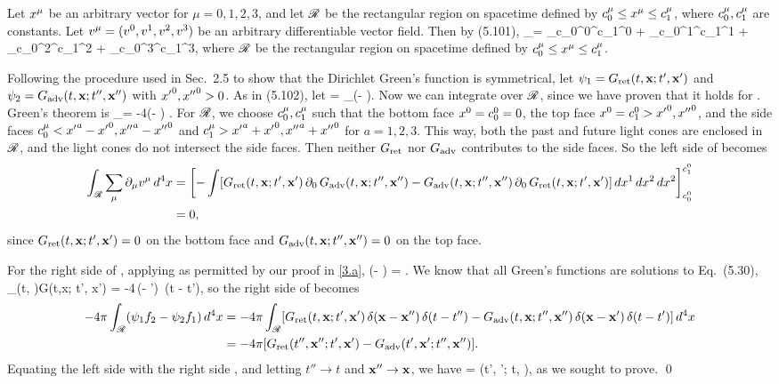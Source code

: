 \begin{solution}
	Let $x^\mu$ be an arbitrary vector for $\mu = 0, 1, 2, 3$, and let $\mathscr{R}$ be the rectangular region on spacetime defined by $c^\mu_0 \leq x^\mu \leq c^\mu_1$, where $c^\mu_0, c^\mu_1$ are constants.  Let $v^\mu = (v^0, v^1, v^2, v^3)$ be an arbitrary differentiable vector field.  Then by (5.101),
	\beq
		\intsR \sum_\mu \dmu \vmu \dfx = \left[\int \vo \dxq \dxw \dxe \right]_{c_0^0}^{c_1^0} + \left[ \int \vq \dxo \dxw \dxe \right]_{c_0^1}^{c_1^1} + \left[ \int \vw \dxo \dxq \dxe \right]_{c_0^2}^{c_1^2} + \left[ \int \ve \dxo \dxq \dxw \right]_{c_0^3}^{c_1^3},
	\eeq
	where $\mathscr{R}$ be the rectangular region on spacetime defined by $c^\mu_0 \leq x^\mu \leq c^\mu_1$.
	
	Following the procedure used in Sec.~2.5 to show that the Dirichlet Green's function is symmetrical, let $\psi_1 = G_{\text{ret}}(t, \vb{x}; t', \vb{x}')$ and $\psi_2 = G_{\text{adv}}(t, \vb{x}; t'', \vb{x}'')$ with ${x'}^0, {x''}^0 > 0$.  As in (5.102), let
	\beq
		\vmu = \sum_\nu \etamunu (\psiq \dnu \psiw - \psiw \dnu \psiq).
	\eeq
	Now we can integrate  over $\mathscr{R}$, since we have proven that it holds for .  Green's theorem is
	\beqn \label{green}
		\intsR \sum_\mu \dmu \vmu \dfx = -4\pi \intsR (\psiq \fw - \psiw \fq) \dfx.
	\eeqn
	For $\mathscr{R}$, we choose $c^\mu_0, c^\mu_1$ such that the bottom face $x^0 = c_0^0 = 0$, the top face $x^0 = c_1^0 > {x'}^0, {x''}^0$, and the side faces $c^\mu_0 < {x'}^a - {x'}^0, {x''}^a - {x''}^0$ and $c^\mu_1 > {x'}^a + {x'}^0, {x''}^a + {x''}^0$ for $a = 1, 2, 3$.  This way, both the past and future light cones are enclosed in $\mathscr{R}$, and the light cones do not intersect the side faces.  Then neither $G_{\text{ret}}$ nor $G_{\text{adv}}$ contributes to the side faces.  So the left side of  becomes
	\begin{align}
		\int_{\mathscr{R}} \sum_\mu \partial_\mu v^\mu \dd[4]{x} &= \left[ -\int [G_{\text{ret}}(t, \vb{x}; t', \vb{x}') \, \partial_0 \, G_{\text{adv}}(t, \vb{x}; t'', \vb{x}'') - G_{\text{adv}}(t, \vb{x}; t'', \vb{x}'') \,\partial_0\, G_{\text{ret}}(t, \vb{x}; t', \vb{x}')] \dd{x^1} \dd{x^2} \dd{x^2} \right]_{c_0^0}^{c_1^0} \notag \\
		&= 0, \label{left}
	\end{align}
	since $G_{\text{ret}}(t, \vb{x}; t', \vb{x}') = 0$ on the bottom face and $G_{\text{adv}}(t, \vb{x}; t'', \vb{x}'') = 0$ on the top face.
	
	For the right side of , applying  as permitted by our proof in \ref{3.a},
	\pi \intsR (\psiq \fw - \psiw \fq) \dfx = \intsR [\Grettx \, \Box \Gadvtx - \Gadvtx \, \Box \Grettx] \dfx.
	\eeq
	We know that all Green's functions are solutions to Eq.~(5.30),
	\beq
		\Box_{(t, \vx)}G(t,x; t', x') = -4\pi \,\del(\vx - \vx') \,\del(t - t'),
	\eeq
	so the right side of  becomes
	\begin{align}
		-4\pi \int_{\mathscr{R}} (\psi_1 f_2 - \psi_2 f_1) \dd[4]{x} &= -4\pi \int_{\mathscr{R}} [G_{\text{ret}}(t, \vb{x}; t', \vb{x}') \, \delta(\vb{x} - \vb{x}'') \,\delta(t - t'') - G_{\text{adv}}(t, \vb{x}; t'', \vb{x}'') \, \delta(\vb{x} - \vb{x}') \,\delta(t - t')] \dd[4]{x} \notag \\
		&= -4\pi [G_{\text{ret}}(t'', \vb{x}''; t', \vb{x}') - G_{\text{adv}}(t', \vb{x}'; t'', \vb{x}'')]. \label{right}
	\end{align}
	Equating the left side  with the right side , and letting $t'' \to t$ and $\vb{x}'' \to \vb{x}$, we have
	\beq
		\Grettx = \Gadv(t', \vx'; t, \vx),
	\eeq
	as we sought to prove. \qed
\end{solution}